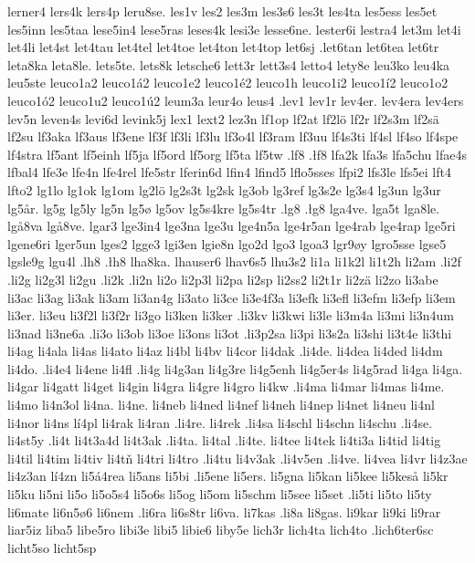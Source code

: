 {{lerner4
lers4k
lers4p
leru8se.
les1v
les2
les3m
les3s6
les3t
les4ta
les5ess
les5et
les5inn
les5taa
lese5in4
lese5ras
leses4k
lesi3e
lesse6ne.
lester6i
lestra4
let3m
let4i
let4li
let4st
let4tau
let4tel
let4toe
let4ton
let4top
let6sj
.let6tan
let6tea
let6tr
leta8ka
leta8le.
lets5te.
lets8k
letsche6
lett3r
lett3s4
letto4
lety8e
leu3ko
leu4ka
leu5ste
leuco1a2
leuco1á2
leuco1e2
leuco1é2
leuco1h
leuco1i2
leuco1í2
leuco1o2
leuco1ó2
leuco1u2
leuco1ú2
leum3a
leur4o
leus4
.lev1
lev1r
lev4er.
lev4era
lev4ers
lev5n
leven4s
levi6d
levink5j
lex1
lext2
lez3n
lf1op
lf2at
lf2lö
lf2r
lf2s3m
lf2sä
lf2su
lf3aka
lf3aus
lf3ene
lf3f
lf3li
lf3lu
lf3o4l
lf3ram
lf3uu
lf4s3ti
lf4sl
lf4so
lf4spe
lf4stra
lf5ant
lf5einh
lf5ja
lf5ord
lf5org
lf5ta
lf5tw
.lf8
.łf8
lfa2k
lfa3s
lfa5chu
lfae4s
lfbal4
lfe3e
lfe4n
lfe4rel
lfe5str
lferin6d
lfin4
lfind5
lflo5sses
lfpi2
lfs3le
lfs5ei
lft4
lfto2
lg1lo
lg1ok
lg1om
lg2lö
lg2s3t
lg2sk
lg3ob
lg3ref
lg3s2e
lg3s4
lg3un
lg3ur
lg5år.
lg5g
lg5ly
lg5n
lg5ø
lg5ov
lg5s4kre
lg5s4tr
.lg8
.łg8
lga4ve.
lga5t
lga8le.
lgå8va
lgå8ve.
lgar3
lge3in4
lge3na
lge3u
lge4n5a
lge4r5an
lge4rab
lge4rap
lge5ri
lgene6ri
lger5un
lges2
lgge3
lgi3en
lgie8n
lgo2d
lgo3
lgoa3
lgr9øy
lgro5sse
lgse5
lgsle9g
lgu4l
.lh8
.łh8
lha8ka.
lhauser6
lhav6s5
lhu3s2
li1a
li1k2l
li1t2h
li2am
.li2f
.li2g
li2g3l
li2gu
.li2k
.li2n
li2o
li2p3l
li2pa
li2sp
li2ss2
li2t1r
li2zä
li2zo
li3abe
li3ac
li3ag
li3ak
li3am
li3an4g
li3ato
li3ce
li3e4f3a
li3efk
li3efl
li3efm
li3efp
li3em
li3er.
li3eu
li3f2l
li3f2r
li3go
li3ken
li3ker
.li3kv
li3kwi
li3le
li3m4a
li3mi
li3n4um
li3nad
li3ne6a
.li3o
li3ob
li3oe
li3ons
li3ot
.li3p2sa
li3pi
li3s2a
li3shi
li3t4e
li3thi
li4ag
li4ala
li4as
li4ato
li4az
li4bl
li4bv
li4cor
li4dak
.li4de.
li4dea
li4ded
li4dm
li4do.
.li4e4
li4ene
li4fl
.li4g
li4g3an
li4g3re
li4g5enh
li4g5er4s
li4g5rad
li4ga
li4ga.
li4gar
li4gatt
li4get
li4gin
li4gra
li4gre
li4gro
li4kw
.li4ma
li4mar
li4mas
li4me.
li4mo
li4n3ol
li4na.
li4ne.
li4neb
li4ned
li4nef
li4neh
li4nep
li4net
li4neu
li4nl
li4nor
li4ns
lí4pl
li4rak
li4ran
.li4re.
li4rek
.li4sa
li4schl
li4schn
li4schu
.li4se.
li4st5y
.li4t
li4t3a4d
li4t3ak
.li4ta.
li4tal
.li4te.
li4tee
li4tek
li4ti3a
li4tid
li4tig
li4til
li4tim
li4tiv
li4tň
li4tri
li4tro
.li4tu
li4v3ak
.li4v5en
.li4ve.
li4vea
li4vr
li4z3ae
li4z3an
lí4zn
li5á4rea
li5ans
li5bi
.li5ene
li5ers.
li5gna
li5kan
li5kee
li5keså
li5kr
li5ku
li5ni
li5o
li5o5s4
li5o6s
li5og
li5om
li5schm
li5see
li5set
.li5ti
li5to
li5ty
li6mate
li6n5ø6
li6nem
.li6ra
li6s8tr
li6va.
li7kas
.li8a
li8gas.
li9kar
li9ki
li9rar
liar5iz
liba5
libe5ro
libi3e
libi5
libie6
liby5e
lich3r
lich4ta
lich4to
.lich6ter6sc
licht5so
licht5sp
}}
